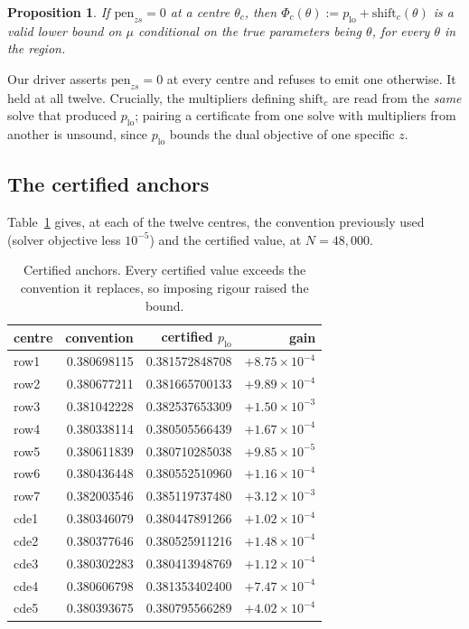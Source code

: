 \documentclass[11pt]{article}
\newtheorem{proposition}[theorem]{Proposition}
\theoremstyle{definition}
\begin{document}
\begin{proposition}\label{prop:transport}
If $\mathrm{pen}_{zs} = 0$ at a centre $\theta_c$, then
$\Phi_c(\theta) := p_{\mathrm{lo}} + \mathrm{shift}_c(\theta)$
is a valid lower bound on $\mu$ conditional on the true parameters being
$\theta$, for every $\theta$ in the region.
\end{proposition}

Our driver asserts $\mathrm{pen}_{zs} = 0$ at every centre and refuses to
emit one otherwise. It held at all twelve. Crucially, the multipliers
defining $\mathrm{shift}_c$ are read from the \emph{same} solve that
produced $p_{\mathrm{lo}}$; pairing a certificate from one solve with
multipliers from another is unsound, since $p_{\mathrm{lo}}$ bounds the
dual objective of one specific $z$.

\subsection{The certified anchors}

Table~\ref{tab:anchors} gives, at each of the twelve centres, the
convention previously used (solver objective less $10^{-5}$) and the
certified value, at $N = 48{,}000$.

\begin{table}[h]\centering
\begin{tabular}{lrrr}
\toprule
centre & convention & certified $p_{\mathrm{lo}}$ & gain \\
\midrule
row1 & 0.380698115 & 0.381572848708 & $+8.75\times10^{-4}$ \\
row2 & 0.380677211 & 0.381665700133 & $+9.89\times10^{-4}$ \\
row3 & 0.381042228 & 0.382537653309 & $+1.50\times10^{-3}$ \\
row4 & 0.380338114 & 0.380505566439 & $+1.67\times10^{-4}$ \\
row5 & 0.380611839 & 0.380710285038 & $+9.85\times10^{-5}$ \\
row6 & 0.380436448 & 0.380552510960 & $+1.16\times10^{-4}$ \\
row7 & 0.382003546 & 0.385119737480 & $+3.12\times10^{-3}$ \\
cde1 & 0.380346079 & 0.380447891266 & $+1.02\times10^{-4}$ \\
cde2 & 0.380377646 & 0.380525911216 & $+1.48\times10^{-4}$ \\
cde3 & 0.380302283 & 0.380413948769 & $+1.12\times10^{-4}$ \\
cde4 & 0.380606798 & 0.381353402400 & $+7.47\times10^{-4}$ \\
cde5 & 0.380393675 & 0.380795566289 & $+4.02\times10^{-4}$ \\
\bottomrule
\end{tabular}
\caption{Certified anchors. Every certified value exceeds the convention
it replaces, so imposing rigour raised the bound.}\label{tab:anchors}
\end{table}
\end{document}
